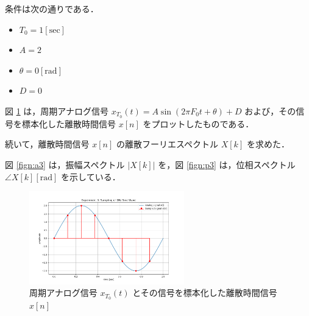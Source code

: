 \documentclass[fleqn, a4paper. 12pt]{jsarticle}
\begin{document}
  条件は次の通りである．

  \begin{itemize}
    \item $T_0 = 1 [\mathrm{sec}]$
    \item $A = 2$
    \item $\theta = 0 [\mathrm{rad}]$
    \item $D = 0$
  \end{itemize}

  図 \ref{fig:s3} は，周期アナログ信号 $x_{T_0}(t)=A \sin \left(2 \pi F_0 t+\theta\right)+D$ および，その信号を標本化した離散時間信号 $x[n]$ をプロットしたものである．

  続いて，離散時間信号 $x[n]$ の離散フーリエスペクトル $X[k]$ を求めた．

  図 \ref{fign:a3} は，振幅スペクトル $|X[k]|$ を，図 \ref{fign:p3} は，位相スペクトル $\angle X[k][\mathrm{rad}]$ を示している．

  \begin{figure}[!h]
    \centering
    \includegraphics[width=0.6\textwidth]{sampling_experiment_3.png}
    \caption{周期アナログ信号 $x_{T_0}(t)$ とその信号を標本化した離散時間信号 $x[n]$}
    \label{fig:s3}
  \end{figure}
\end{document}
